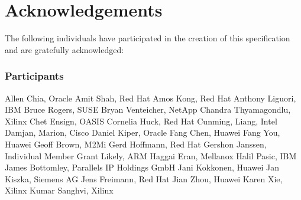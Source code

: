 \chapter{Acknowledgements}\label{chap:Acknowledgements}

The following individuals have participated in the creation of this specification and are gratefully acknowledged:

\subsection*{Participants}
Allen Chia, Oracle	\newline
Amit Shah,	Red Hat	\newline
Amos Kong,	Red Hat	\newline
Anthony Liguori,	IBM	\newline
Bruce Rogers, SUSE	\newline
Bryan Venteicher,	NetApp	\newline
Chandra Thyamagondlu, Xilinx	\newline
Chet Ensign, OASIS	\newline
Cornelia Huck,	Red Hat	\newline
Cunming, Liang, Intel	\newline
Damjan, Marion, Cisco	\newline
Daniel Kiper,	Oracle	\newline
Fang Chen, Huawei	\newline
Fang You, Huawei	\newline
Geoff Brown,	M2Mi	\newline
Gerd Hoffmann, Red Hat	\newline
Gershon Janssen,	Individual Member	\newline
Grant Likely, ARM	\newline
Haggai Eran,	Mellanox	\newline
Halil Pasic,	IBM	\newline
James Bottomley,	Parallels IP Holdings GmbH	\newline
Jani Kokkonen, Huawei	\newline
Jan Kiszka,	Siemens AG	\newline
Jens Freimann, Red Hat	\newline
Jian Zhou,	Huawei	\newline
Karen Xie, Xilinx	\newline
Kumar Sanghvi, Xilinx	\newline
